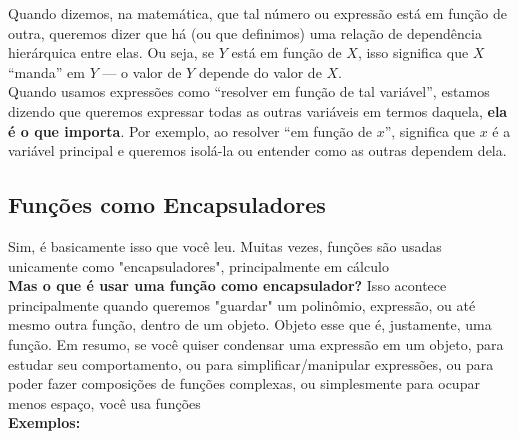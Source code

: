 \documentclass{article}
\begin{document}
Quando dizemos, na matemática, que tal número ou expressão está em função de outra, queremos dizer que há (ou que definimos) uma relação de dependência hierárquica entre elas. Ou seja, se $Y$ está em função de $X$, isso significa que $X$ ``manda'' em $Y$ — o valor de $Y$ depende do valor de $X$.
\\[5pt]
Quando usamos expressões como ``resolver em função de tal variável'', estamos dizendo que queremos expressar todas as outras variáveis em termos daquela, \textbf{ela é o que importa}. Por exemplo, ao resolver ``em função de $x$'', significa que $x$ é a variável principal e queremos isolá-la ou entender como as outras dependem dela.

\subsection{Funções como Encapsuladores}
Sim, é basicamente isso que você leu. Muitas vezes, funções são usadas unicamente como "encapsuladores", principalmente em cálculo
\\[5pt]
\textbf{Mas o que é usar uma função como encapsulador?} Isso acontece principalmente quando queremos "guardar" um polinômio, expressão, ou até mesmo outra função, dentro de um objeto. Objeto esse que é, justamente, uma função. Em resumo, se você quiser condensar uma expressão em um objeto, para estudar seu comportamento, ou para simplificar/manipular expressões, ou para poder fazer composições de funções complexas, ou simplesmente para ocupar menos espaço, você usa funções
\\[5pt]
\textbf{Exemplos:}
\end{document}
